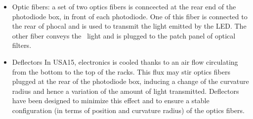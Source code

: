 \begin{itemize}
\item Optic fibers: a set of two optics fibers is conncected at the rear end of the photodiode box, in front of each photodiode. One of this fiber is connected to the rear of phocal and is used to transmit the light emitted by the LED. The other fiber conveys the \laser~light and is plugged to the patch panel of optical filters. 
\item Deflectors
In USA15, electronics is cooled thanks to an air flow circulating from the bottom to the top of the racks. This flux may stir optics fibers plugged at the rear of the photodiode box, inducing a change of the curvature radius and hence a variation of the amount of light transmitted. Deflectors have been designed to minimize this effect and to ensure a stable configuration (in terms of position and curvature radius) of the optics fibers.
\end{itemize}


